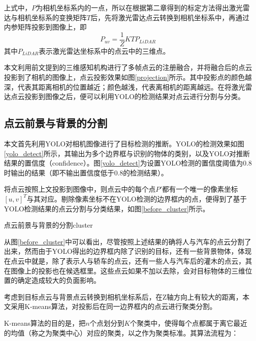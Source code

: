 上式中，$P$为相机坐标系内的一点，所以在根据第二章得到的标定方法得出激光雷达与相机坐标系的变换矩阵$T$后，先将激光雷达点云转换到相机坐标系中，再通过内参矩阵投影到图像上，即
\begin{equation}
    P_{uv} = \frac{1}{Z} KTP_{LiDAR}
\end{equation}
其中$P_{LiDAR}$表示激光雷达坐标系中的点云中的三维点。

本文利用前文提到的三维感知机构进行了多帧点云的注册融合，并将融合后的点云投影到了相机的图像上，点云投影效果如图\ref{projection}所示。其中投影点的颜色越深，代表其距离相机的位置越近；颜色越浅，代表离相机的距离越远。在将激光雷达点云投影到图像之后，便可以利用YOLO的检测结果对点云进行分割与分类。

\subsection{点云前景与背景的分割}
本文首先利用YOLO对相机图像进行了目标检测的推断。YOLO的检测效果如图\ref{yolo_detect}所示，其输出为多个边界框与识别的物体的类别，以及YOLO对推断结果的置信度（confidence）。图\ref{yolo_detect}为设置YOLO检测的置信度阈值为0.8时输出的结果（即不输出置信度低于0.8的检测结果）。

将点云按照上文投影到图像中，则点云中的每个点$P'$都有一个唯一的像素坐标$[u,v]^T$与其对应。剔除像素坐标不在YOLO检测的边界框内的点，便得到了基于YOLO检测结果的点云分割与分类结果，如图\ref{before_cluster}所示。
\begin{pics}[htbp]{点云前景与背景的分割}{cluster}
\end{pics}

从图\ref{before_cluster}中可以看出，尽管按照上述结果的确将人与汽车的点云分割了出来，然而由于YOLO得出的边界框内除了识别的目标，还有一些背景物体，体现在点云中就是，除了表示人与轿车的点云，还有一些人与汽车后的灌木的点云，其在图像上的投影也在候选框里。这些点云如果不加以去除，会对目标物体的三维位置的确定造成较大的负面影响。

考虑到目标点云与背景点云转换到相机坐标系后，在Z轴方向上有较大的距离，本文采用K-means算法，对投影后在同一边界框内的点云进行聚类分割。

K-means算法的目的是，把$n$个点划分到$K$个聚类中，使得每个点都属于离它最近的均值（称之为聚类中心）对应的聚类，以之作为聚类标准。其算法流程为：

